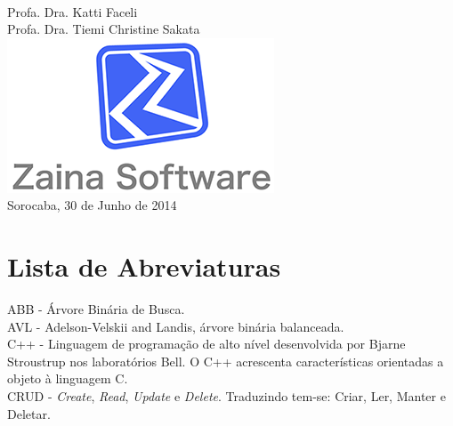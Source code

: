 \documentclass[a4paper]{article}
\begin{document}
\begin{titlepage}
\begin{minipage}{0.4\textwidth}
\begin{flushright}
\end{flushright}
\end{minipage}\\[2cm]


{\large Profa. Dra. Katti Faceli}\\
{\large Profa. Dra. Tiemi Christine Sakata}\\[1cm]


\includegraphics{logo.png}\\[0cm] %
 

\vspace{1cm}
\large {Sorocaba, 30 de Junho de 2014}


\vfill %

\end{titlepage}


\tableofcontents

\vfill
{}
\section*{Lista de Abreviaturas}

ABB - Árvore Binária de Busca.\\
AVL - Adelson-Velskii and Landis, árvore binária balanceada.\\
C++ - Linguagem de programação de alto nível desenvolvida por Bjarne Stroustrup nos laboratórios Bell. O C++ acrescenta características orientadas a objeto à linguagem C.\\
CRUD - \textit{Create}, \textit{Read}, \textit{Update} e \textit{Delete}. Traduzindo tem-se: Criar, Ler, Manter e Deletar.\\
\end{document}
